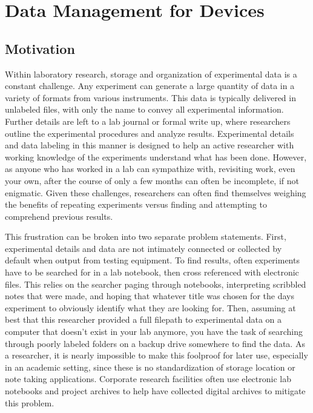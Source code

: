 \documentclass[../thesis.tex]{subfiles}
\begin{document}
\chapter{Data Management for Devices}\label{sec:data}


\section{Motivation}


Within laboratory research, storage and organization of experimental data is a constant challenge.
Any experiment can generate a large quantity of data in a variety of formats from various instruments.
This data is typically delivered in unlabeled files, with only the name to convey all experimental information.
Further details are left to a lab journal or formal write up, where researchers outline the experimental procedures and analyze results.
Experimental details and data labeling in this manner is designed to help an active researcher with working knowledge of the experiments understand what has been done.
However, as anyone who has worked in a lab can sympathize with, revisiting work, even your own, after the course of only a few months can often be incomplete, if not enigmatic.
Given these challenges, researchers can often find themselves weighing the benefits of repeating experiments versus finding and attempting to comprehend previous results.

This frustration can be broken into two separate problem statements.
First, experimental details and data are not intimately connected or collected by default when output from testing equipment.
To find results, often experiments have to be searched for in a lab notebook, then cross referenced with electronic files.  
This relies on the searcher paging through notebooks, interpreting scribbled notes that were made, and hoping that whatever title was chosen for the days experiment to obviously identify what they are looking for.
Then, assuming at best that this researcher provided a full filepath to experimental data on a computer that doesn't exist in your lab anymore, you have the task of searching through poorly labeled folders on a backup drive somewhere to find the data.
As a researcher, it is nearly impossible to make this foolproof for later use, especially in an academic setting, since these is no standardization of storage location or note taking applications.
Corporate research facilities often use electronic lab notebooks and project archives to help have collected digital archives to mitigate this problem. 
\end{document}
